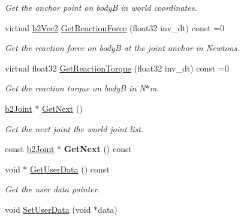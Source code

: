 \begin{DoxyCompactItemize}
\begin{DoxyCompactList}\small\item\em Get the anchor point on bodyB in world coordinates. \end{DoxyCompactList}\item 
virtual \hyperlink{structb2_vec2}{b2\+Vec2} \hyperlink{classb2_joint_a7ab58d67a56ff173957286558b08118a}{Get\+Reaction\+Force} (float32 inv\+\_\+dt) const  =0\hypertarget{classb2_joint_a7ab58d67a56ff173957286558b08118a}{}\label{classb2_joint_a7ab58d67a56ff173957286558b08118a}

\begin{DoxyCompactList}\small\item\em Get the reaction force on bodyB at the joint anchor in Newtons. \end{DoxyCompactList}\item 
virtual float32 \hyperlink{classb2_joint_a0b1e4fcdea490c49a9ac1133e5244566}{Get\+Reaction\+Torque} (float32 inv\+\_\+dt) const  =0\hypertarget{classb2_joint_a0b1e4fcdea490c49a9ac1133e5244566}{}\label{classb2_joint_a0b1e4fcdea490c49a9ac1133e5244566}

\begin{DoxyCompactList}\small\item\em Get the reaction torque on bodyB in N$\ast$m. \end{DoxyCompactList}\item 
\hyperlink{classb2_joint}{b2\+Joint} $\ast$ \hyperlink{classb2_joint_a1a0e2137b631010750c728cb4e276e5d}{Get\+Next} ()\hypertarget{classb2_joint_a1a0e2137b631010750c728cb4e276e5d}{}\label{classb2_joint_a1a0e2137b631010750c728cb4e276e5d}

\begin{DoxyCompactList}\small\item\em Get the next joint the world joint list. \end{DoxyCompactList}\item 
const \hyperlink{classb2_joint}{b2\+Joint} $\ast$ {\bfseries Get\+Next} () const \hypertarget{classb2_joint_a1ac83edb39806085608c9d549dd98550}{}\label{classb2_joint_a1ac83edb39806085608c9d549dd98550}

\item 
void $\ast$ \hyperlink{classb2_joint_a505ab02c234f1cc20aa3375f3ab7b587}{Get\+User\+Data} () const \hypertarget{classb2_joint_a505ab02c234f1cc20aa3375f3ab7b587}{}\label{classb2_joint_a505ab02c234f1cc20aa3375f3ab7b587}

\begin{DoxyCompactList}\small\item\em Get the user data pointer. \end{DoxyCompactList}\item 
void \hyperlink{classb2_joint_a492f2d02496437572aaec6013ebdc1c8}{Set\+User\+Data} (void $\ast$data)\hypertarget{classb2_joint_a492f2d02496437572aaec6013ebdc1c8}{}\label{classb2_joint_a492f2d02496437572aaec6013ebdc1c8}


\end{DoxyCompactItemize}
